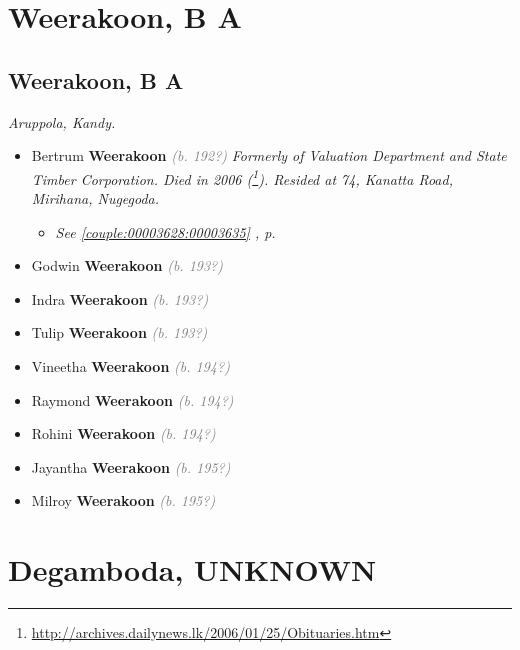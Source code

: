 \documentclass[10pt, openany]{book}
\begin{document}
\part{Weerakoon, B A}
\chapter{Weerakoon, B A}
\label{00003666}
\textcolor{slmaroon}{\textit{Aruppola, Kandy.}}
\begin{itemize}
\item{Bertrum \textbf{Weerakoon} \textcolor{gray}{\textit{(b. 192?)}} \textcolor{slmaroon}{\textit{Formerly of Valuation Department and State Timber Corporation.
Died in 2006 (\footnote{\url{http://archives.dailynews.lk/2006/01/25/Obituaries.htm}}).
Resided at 74, Kanatta Road, Mirihana, Nugegoda.}}
\begin{itemize}
\item{\textcolor{slteal}{\textit{See  \autoref{couple:00003628:00003635} \textit{, p. \pageref{couple:00003628:00003635} }}}}
\end{itemize}
 }
\item{Godwin \textbf{Weerakoon} \textcolor{gray}{\textit{(b. 193?)}}
 }
\item{Indra \textbf{Weerakoon} \textcolor{gray}{\textit{(b. 193?)}}
 }
\item{Tulip \textbf{Weerakoon} \textcolor{gray}{\textit{(b. 193?)}}
 }
\item{Vineetha \textbf{Weerakoon} \textcolor{gray}{\textit{(b. 194?)}}
 }
\item{Raymond \textbf{Weerakoon} \textcolor{gray}{\textit{(b. 194?)}}
 }
\item{Rohini \textbf{Weerakoon} \textcolor{gray}{\textit{(b. 194?)}}
 }
\item{Jayantha \textbf{Weerakoon} \textcolor{gray}{\textit{(b. 195?)}}
 }
\item{Milroy \textbf{Weerakoon} \textcolor{gray}{\textit{(b. 195?)}}
 }
\end{itemize}
  
\part{Degamboda, UNKNOWN}
\end{document}
